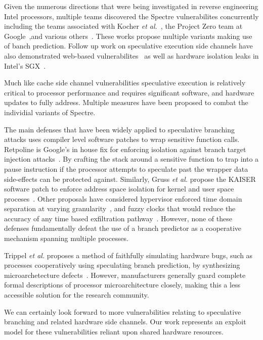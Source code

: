 Given the numerous directions that were being investigated in reverse engineering 
Intel processors, multiple teams discovered the Spectre vulnerabilites concurrently including 
the teams associated with Kocher \textit{et al.}~\cite{spectre}, the Project Zero team 
at Google~\cite{project_zero},and various others~\cite{evtyushkin2018branchscope,maisuradze2018speculose}. 
These works propose multiple variants making use of banch prediction.  Follow 
up work on speculative execution side channels have also demonstrated
web-based vulnerabilites~\cite{genkin2018drive} as well as hardware isolation  
leaks in Intel's SGX~\cite{spectre_sgx}. 


Much like cache side channel vulnerabilities speculative execution is relatively
critical to processor performance and requires significant software, and hardware 
updates to fully address. Multiple measures have been proposed to combat the 
individial variants of Spectre.   

The main defenses that have been widely applied to 
speculative branching attacks uses compiler level software patches to wrap sensitive 
function calls. Retpoline is Google's in house fix for enforcing 
isolation against branch target injection attacks~\cite{retpoline}. By crafting 
the stack around a sensitive function to trap into a pause instruction if the processor 
attempts to speculate past the wrapper data side-effects can be protected against. 
Similarly, Gruss \textit{et al.} propose the KAISER software patch to enforce address space
isolation for kernel and user space proceses~\cite{gruss2017kaslr}. 
Other proposals have considered hypervisor enforced time domain separation at varying 
granularity~\cite{renau2018securing}, and fuzzy clocks that would reduce the accuracy 
of any time based exfiltration pathway~\cite{hu1992reducing}. However, none of these defenses 
fundamentally defeat the use of a branch predictor as a cooperative mechanism
spanning multiple processes. 

Trippel \textit{et al.} proposes a method of faithfully simulating 
hardware bugs, such as processes cooperatively using speculating branch prediction,
by synthesizing microarchetecture defects~\cite{trippel2018meltdownprime}. However, 
manufacturers generally guard complete formal descriptions of processor microarchitecture closely, 
making this a less accessible solution for the research community.

\smallskip

We can certainly look forward to more vulnerabilities relating to speculative 
branching and related hardware side channels. Our work represents an exploit 
model for these vulnerabilities reliant upon shared hardware resources. 




